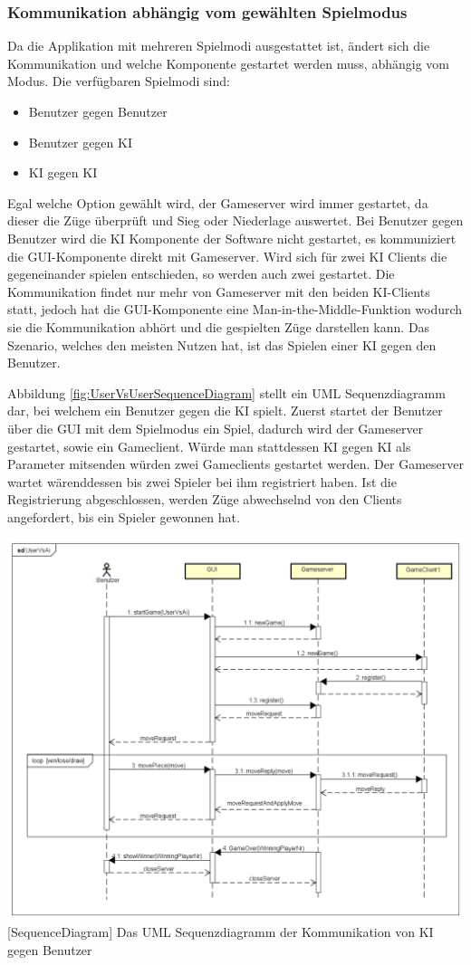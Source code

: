\documentclass[12pt,a4paper,bibliography=totocnumbered,listof=totocnumbered]{article}
\begin{document}
\subsubsection{Kommunikation abhängig vom gewählten Spielmodus}
\label{chap:NetworkModie}
Da die Applikation mit mehreren Spielmodi ausgestattet ist, ändert sich die Kommunikation und welche Komponente gestartet werden muss, abhängig vom Modus.
Die verfügbaren Spielmodi sind:
\begin{itemize}
    \item Benutzer gegen Benutzer
    \item Benutzer gegen KI
    \item KI gegen KI
\end{itemize}
Egal welche Option gewählt wird, der Gameserver wird immer gestartet, da dieser die Züge überprüft und Sieg oder Niederlage auswertet.
Bei Benutzer gegen Benutzer wird die KI Komponente der Software nicht gestartet, es kommuniziert die GUI-Komponente direkt mit Gameserver.
Wird sich für zwei KI Clients die gegeneinander spielen entschieden, so werden auch zwei gestartet.
Die Kommunikation findet nur mehr von Gameserver mit den beiden KI-Clients statt, jedoch hat die GUI-Komponente eine Man-in-the-Middle-Funktion
wodurch sie die Kommunikation abhört und die gespielten Züge darstellen kann.
Das Szenario, welches den meisten Nutzen hat, ist das Spielen einer KI gegen den Benutzer. 

Abbildung \ref{fig:UserVsUserSequenceDiagram} stellt ein UML Sequenzdiagramm dar, bei welchem ein Benutzer gegen die KI spielt.
Zuerst startet der Benutzer über die GUI mit dem Spielmodus ein Spiel, dadurch wird der Gameserver gestartet, sowie ein
Gameclient. Würde man stattdessen KI gegen KI als Parameter mitsenden würden zwei Gameclients gestartet werden. 
Der Gameserver wartet wärenddessen bis zwei Spieler bei ihm registriert haben. Ist die Registrierung abgeschlossen, werden Züge
abwechselnd von den Clients angefordert, bis ein Spieler gewonnen hat.

\vspace{1em}
\begin{minipage}{\linewidth}
	\centering
	\includegraphics[width=0.83\linewidth]{pics/UserVsAiCommunication.png}
	[SequenceDiagram]{ Das UML Sequenzdiagramm der Kommunikation von KI gegen Benutzer}
	\label{fig:UserVsUserSequenceDiagram}
\end{minipage}
\end{document}
